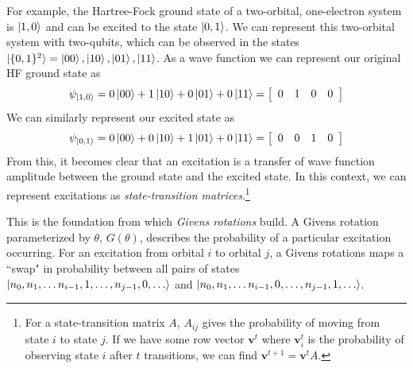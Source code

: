\documentclass[11pt]{article}
\begin{document}
For example, the Hartree-Fock ground state of a two-orbital, one-electron system is $\ket{1, 0}$ and can be excited to the state $\ket{0, 1}$. We can represent this two-orbital system with two-qubits, which can be observed in the states $\ket{\{0,1\}^2} = \ket{00}, \ket{10}, \ket{01}, \ket{11}$. As a wave function we can represent our original HF ground state as 
$$\psi_{\ket{1, 0}} = 
0\ket{00} + 1\ket{10} +  0\ket{01} + 0\ket{11} = \left[\begin{array}{cccc}
 0 & 1 & 0 & 0
\end{array}\right]
$$
We can similarly represent our excited state as 
$$\psi_{\ket{0, 1}} = 
0\ket{00} + 0\ket{10} +  1\ket{01} + 0\ket{11} = \left[\begin{array}{cccc}
 0 & 0 & 1 & 0
\end{array}\right]
$$
From this, it becomes clear that an excitation is a transfer of wave function amplitude between the ground state and the excited state. In this context, we can represent excitations as \emph{state-transition matrices}.\footnote{For a state-transition matrix $A$, $A_{ij}$ gives the probability of moving from state $i$ to state $j$. If we have some row vector $\mathbf{v}^t$ where $\mathbf{v}_i^t$ is the probability of observing state $i$ after $t$ transitions, we can find $\mathbf{v}^{t+1} = \mathbf{v}^{t}A$.}

This is the foundation from which \emph{Givens rotations} build. A Givens rotation parameterized by $\theta$, $G(\theta)$, describes the probability of a particular excitation occurring. For an excitation from orbital $i$ to orbital $j$, a Givens rotations maps a ``swap" in probability between all pairs of states $\ket{n_0, n_1, \dots n_{i-1}, 1, \dots, n_{j-1}, 0, \dots}$ and  $\ket{n_0, n_1, \dots n_{i-1}, 0, \dots, n_{j-1}, 1, \dots}$. 
\end{document}
